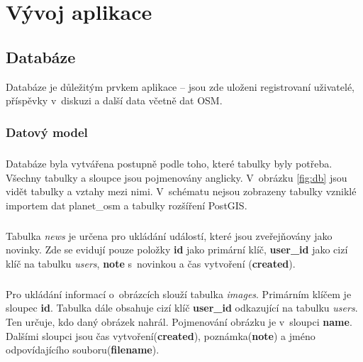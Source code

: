 \documentclass[11pt,a4paper,titlepage,oneside]{book}
\begin{document}
\chapter{Vývoj aplikace}
		\section{Databáze}
Databáze je důležitým prvkem aplikace  -- jsou zde uloženi registrovaní uživatelé, příspěvky v~diskuzi a další data včetně dat \ac{OSM}.
			\subsection{Datový model}
				\paragraph{}  Databáze byla vytvářena postupně podle toho, které tabulky byly potřeba. Všechny tabulky a sloupce jsou pojmenovány anglicky. V~obrázku \ref{fig:db} jsou vidět tabulky a vztahy mezi nimi. V~schématu nejsou zobrazeny tabulky vzniklé importem dat planet\_osm a tabulky rozšíření PostGIS. 
				\paragraph{}Tabulka \textit{news} je určena pro ukládání událostí, které jsou zveřejňovány jako novinky. Zde se evidují pouze položky \textbf{id} jako primární klíč, \textbf{user\_id} jako cizí klíč na tabulku \textit{users}, \textbf{note} s~novinkou a čas vytvoření (\textbf{created}).

				\paragraph{}Pro ukládání informací o~obrázcích slouží tabulka \textit{images}. Primárním klíčem je sloupec \textbf{id}. Tabulka dále obsahuje cizí klíč \textbf{user\_id} odkazující na tabulku \textit{users}. Ten určuje, kdo daný obrázek nahrál. Pojmenování obrázku je v~sloupci \textbf{name}. Dalšími sloupci jsou čas vytvoření(\textbf{created}), poznámka(\textbf{note}) a jméno odpovídajícího souboru(\textbf{filename}).


\end{document}
